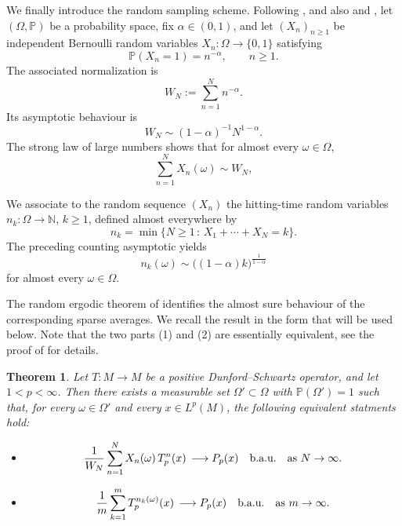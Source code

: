 \documentclass[12pt]{amsart}
\newcommand{\Ndb}{\mbox{$\mathbb{N}$}}
\newcommand{\Pdb}{\mbox{$\mathbb{P}$}}
\newtheorem{theorem}{Theorem}[section]
\theoremstyle{remark}
\theoremstyle{definition}
\numberwithin{equation}{section}
\begin{document}
We finally introduce the random sampling scheme. Following \cite{LZ},
and also \cite{FLW} and \cite{LaV}, let $(\Omega,\mathbb P)$ be a
probability space, fix $\alpha\in(0,1)$, and let
$(X_n)_{n\geq1}$ be independent Bernoulli random variables
$X_n\colon\Omega\to\{0,1\}$ satisfying
\begin{equation}\label{2Alpha}
\mathbb P(X_n=1)=n^{-\alpha},\qquad n\geq1.
\end{equation}
The associated normalization is
\begin{equation}\label{2WN}
W_N:=\sum_{n=1}^N n^{-\alpha}.
\end{equation}
Its asymptotic behaviour is
\begin{equation}\label{2WNEquiv}
W_N\sim(1-\alpha)^{-1}N^{1-\alpha}.
\end{equation}
The strong law of large numbers \cite[Appendix A]{FLW} shows that for almost every $\omega\in\Omega$,
\begin{equation}\label{2SLLN}
\sum_{n=1}^NX_n(\omega)\sim W_N,
\end{equation}


We associate to the random
sequence $(X_n)$ the hitting-time random
variables $n_k\colon\Omega\to\Ndb$, $k\geq1$, defined almost everywhere by
$$
n_k=\min\bigl\{N\geq1\,:\,X_1+\cdots+X_N=k\bigr\}.
$$
The preceding counting asymptotic yields
$$
n_k(\omega)\sim
\bigl((1-\alpha)k\bigr)^{\frac{1}{1-\alpha}}
$$
for almost every $\omega\in\Omega$.

The random ergodic theorem of \cite{LZ} identifies the almost sure
behaviour of the corresponding sparse averages. We recall the result in
the form that will be used below. Note that the two parts (1) and (2)
are essentially equivalent, see the proof of \cite[Theorem 5.2]{LZ} for details.

\begin{theorem}\label{2Back}
Let $T\colon M\to M$ be a positive Dunford--Schwartz operator, and let
$1<p<\infty$. Then there exists a measurable set
$\Omega'\subset\Omega$ with $\Pdb(\Omega')=1$ such that, for every
$\omega\in\Omega'$ and every $x\in L^p(M)$, the following equivalent statments hold:
\begin{itemize}
\item[(1)]
$$
\frac{1}{W_N}\sum_{n=1}^N X_n(\omega)\, T_p^n(x)
\,\longrightarrow P_p(x)\quad\hbox{b.a.u.}
\quad\hbox{as } N\to\infty.
$$
\item[(2)]
$$
\frac{1}{m}\sum_{k=1}^m T_p^{n_k(\omega)}(x)
\,\longrightarrow P_p(x)\quad\hbox{b.a.u.}
\quad\hbox{as } m\to\infty.
$$
\end{itemize}
\end{theorem}
\end{document}
